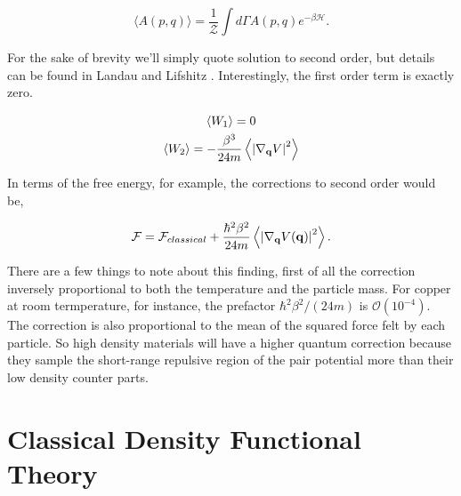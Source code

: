 \begin{equation}
    \langle A(p, q) \rangle = \frac{1}{\mathcal{Z}} 
        \int d\Gamma A(p, q) e^{-\beta \mathcal{H}}.
\end{equation}

For the sake of brevity we'll simply quote solution to second order, but details can be found in Landau and Lifshitz \cite{LANDAU198079}.
Interestingly, the first order term is exactly zero.

\begin{gather}
    \langle W_1 \rangle = 0 \\
    \langle W_2 \rangle = - \frac{\beta^3}{24 m} \left\langle \left\vert\nabla_{\mathbf{q}}V\right\vert^2 \right\rangle
\end{gather}

In terms of the free energy, for example, the corrections to second order would be, 

\begin{equation}
    \mathcal{F} = \mathcal{F}_{classical} + \frac{\hbar^2\beta^2}{24m}
        \left\langle \left\vert \nabla_{\mathbf{q}} V(\mathbf{q}) \right\vert^2 \right\rangle.
\end{equation}

There are a few things to note about this finding, first of all the correction inversely proportional to both the temperature and the particle mass.
For copper at room termperature, for instance, the prefactor $\hbar^2\beta^2/(24 m)$ is $\mathcal{O}(10^{-4})$. 
The correction is also proportional to the mean of the squared force felt by each particle. So high density materials will have a higher quantum correction because they sample the short-range repulsive region of the pair potential more than their low density counter parts.



\section{Classical Density Functional Theory}


